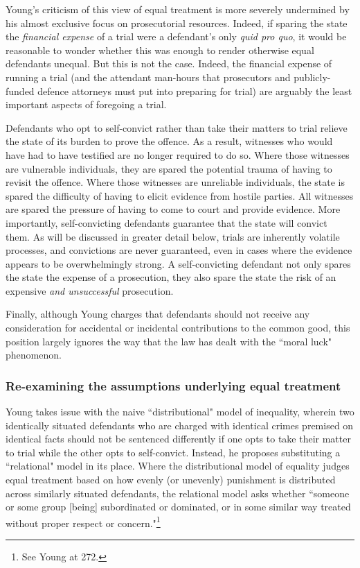 Young's criticism of this view of equal treatment is more severely undermined by his almost exclusive focus on prosecutorial resources. Indeed, if sparing the state the \textit{financial expense} of a trial were a defendant's only \textit{quid pro quo}, it would be reasonable to wonder whether this was enough to render otherwise equal defendants unequal. But this is not the case. Indeed, the financial expense of running a trial (and the attendant man-hours that prosecutors and publicly-funded defence attorneys must put into preparing for trial) are arguably the least important aspects of foregoing a trial. 

Defendants who opt to self-convict rather than take their matters to trial relieve the state of its burden to prove the offence. As a result, witnesses who would have had to have testified are no longer required to do so. Where those witnesses are vulnerable individuals, they are spared the potential trauma of having to revisit the offence. Where those witnesses are unreliable individuals, the state is spared the difficulty of having to elicit evidence from hostile parties. All witnesses are spared the pressure of having to come to court and provide evidence. More importantly, self-convicting defendants guarantee that the state will convict them. As will be discussed in greater detail below, trials are inherently volatile processes, and convictions are never guaranteed, even in cases where the evidence appears to be overwhelmingly strong. A self-convicting defendant not only spares the state the expense of a prosecution, they also spare the state the risk of an expensive \textit{and unsuccessful} prosecution.

Finally, although Young charges that defendants should not receive any consideration for accidental or incidental contributions to the common good, this position largely ignores the way that the law has dealt with the ``moral luck" phenomenon. 



\subsubsection{Re-examining the assumptions underlying equal treatment}

Young takes issue with the naive ``distributional" model of inequality, wherein two identically situated defendants who are charged with identical crimes premised on identical facts should not be sentenced differently if one opts to take their matter to trial while the other opts to self-convict. Instead, he proposes substituting a ``relational" model in its place. Where the distributional model of equality judges equal treatment based on how evenly (or unevenly) punishment is distributed across similarly situated defendants, the relational model asks whether ``someone or some group [being] subordinated or dominated, or in some similar way treated without proper respect or concern."\footnote{See Young at 272.}

